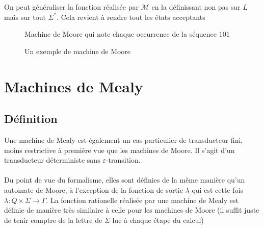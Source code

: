 \documentclass{scrartcl}
\begin{document}
\begin{flushleft}
On peut généraliser la fonction réalisée par $\mathcal{M}$ en la définissant non pas sur $L$ mais sur tout
$\Sigma^*$. Cela revient à rendre tout les états acceptants

\begin{figure}[h]
    \caption{Un exemple de machine de Moore}
        \begin{center}
        Machine de Moore qui note chaque occurrence de la séquence $101$
    \end{center}
\end{figure}

\vspace*{2cm}

\section{Machines de Mealy}

\subsection{Définition}

Une machine de Mealy est également un cas particulier de transducteur fini, moins restrictive à première vue que les machines de Moore.
Il s'agit d'un transducteur déterministe sans $\varepsilon$-transition.
\\~\\
Du point de vue du formalisme, elles sont définies de la même manière qu'un automate de Moore, à l'exception de la fonction de sortie
$\lambda$ qui est cette fois $\lambda : Q \times \Sigma \rightarrow \Gamma$. La fonction rationelle réalisée par une machine de Mealy
est définie de manière très similaire à celle pour les machines de Moore (il suffit juste de tenir comptre de la lettre de $\Sigma$ lue à chaque
étape du calcul)


\end{flushleft}
\end{document}
